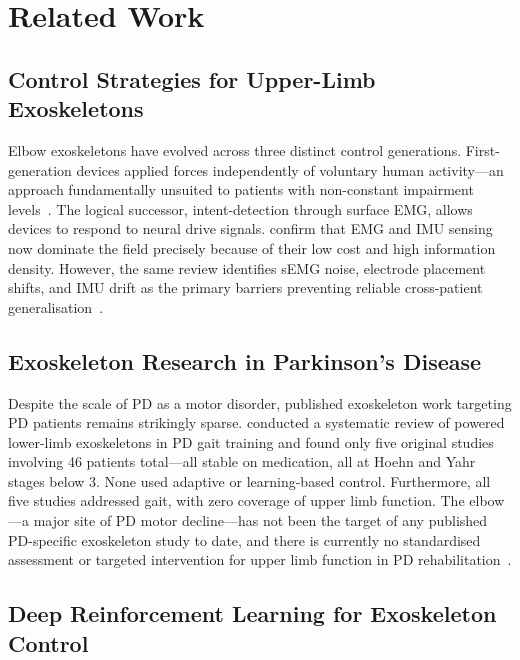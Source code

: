 \documentclass{article}
\begin{document}
\section{Related Work}
\label{sec:related}

\subsection{Control Strategies for Upper-Limb Exoskeletons}

Elbow exoskeletons have evolved across three distinct control generations.
First-generation devices applied forces independently of voluntary human
activity---an approach fundamentally unsuited to patients with non-constant
impairment levels~\citep{gasperina2021}. The logical successor, intent-detection
through surface EMG, allows devices to respond to neural drive signals.
\citet{supriyono2025} confirm that EMG and IMU sensing now dominate the
field precisely because of their low cost and high information density.
However, the same review identifies sEMG noise, electrode placement shifts,
and IMU drift as the primary barriers preventing reliable cross-patient
generalisation~\citep{supriyono2025}.

\subsection{Exoskeleton Research in Parkinson's Disease}

Despite the scale of PD as a motor disorder, published exoskeleton work
targeting PD patients remains strikingly sparse. \citet{fortunati2024}
conducted a systematic review of powered lower-limb exoskeletons in PD
gait training and found only five original studies involving 46 patients
total---all stable on medication, all at Hoehn and Yahr stages below 3.
None used adaptive or learning-based control. Furthermore, all five
studies addressed gait, with zero coverage of upper limb function. The
elbow---a major site of PD motor decline---has not been the target of
any published PD-specific exoskeleton study to date, and there is
currently no standardised assessment or targeted intervention for upper
limb function in PD rehabilitation~\citep{capato2023}.

\subsection{Deep Reinforcement Learning for Exoskeleton Control}
\end{document}
